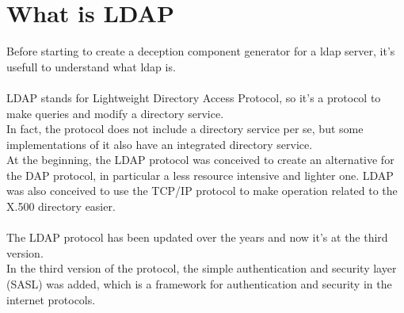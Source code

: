 \chapter{What is LDAP}
Before starting to create a deception component generator for a ldap server, it's usefull to understand what ldap is.
\\\\
LDAP stands for Lightweight Directory Access Protocol, so it’s a protocol to make queries and modify a directory service.  
\\
In fact, the protocol does not include a directory service per se, but some implementations of it also have an integrated directory service. 
\\
At the beginning, the LDAP protocol was conceived to create an alternative for the DAP protocol, in particular a less resource intensive and lighter one. LDAP was also conceived to use the TCP/IP protocol to make operation related to the X.500 directory easier.  
\\\\
The LDAP protocol has been updated over the years and now it’s at the third version. 
\\
In the third version of the protocol, the simple authentication and security layer (SASL) was added, which is a framework for authentication and security in the internet protocols. 
\\\\
